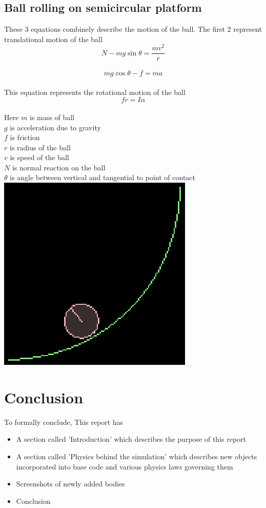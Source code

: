 \documentclass[11pt]{article}
\begin{document}
\subsection{Ball rolling on semicircular platform}
These 3 equations combinely describe the motion of the ball\cite{verma06}. The first 2 represent translational motion of the ball\\
\begin{equation}N-mg\sin\theta=\frac{mv^{2}}{r}\end{equation}\\
\begin{equation}mg\cos\theta-f=ma\end{equation}\\
This equation represents the rotational motion of the ball\\
\begin{equation}fr=I\alpha\end{equation}\\
Here $m$ is mass of ball\\
$g$ is acceleration due to gravity\\
$f$ is friction\\
$r$ is radius of the ball\\
$v$ is speed of the ball\\
$N$ is normal reaction on the ball\\
$\theta$ is angle between vertical and tangential to point of contact\\
\includegraphics{3}
\section{Conclusion}
To formally conclude, This report has\\
\begin{itemize}
\item A section called 'Introduction' which describes the purpose of this report
\item A section called 'Physics behind the simulation' which describes new objects incorporated into base code and various physics laws governing them
\item Screenshots of newly added bodies
\item Conclusion
\end{itemize}


\end{document}
